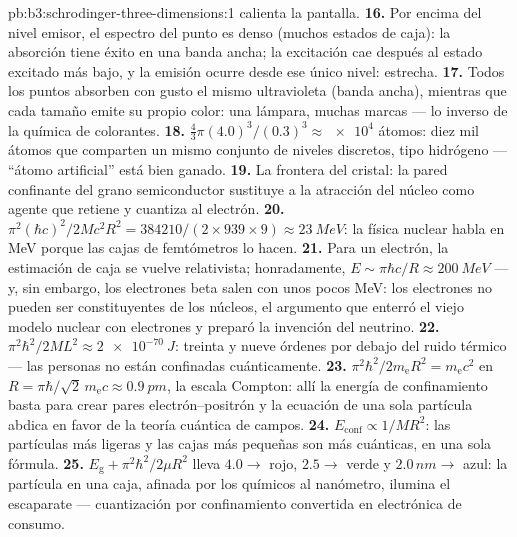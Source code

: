 \begin{solution}{pb:b3:schrodinger-three-dimensions:1}
calienta la pantalla.
\textbf{16.} Por encima del nivel emisor, el espectro del punto es denso
(muchos estados de caja): la absorción tiene éxito en una banda ancha; la
excitación cae después al estado excitado más bajo, y la emisión ocurre
desde ese único nivel: estrecha.
\textbf{17.} Todos los puntos absorben con gusto el mismo ultravioleta
(banda ancha), mientras que cada tamaño emite su propio color: una lámpara,
muchas marcas --- lo inverso de la química de colorantes.
\textbf{18.} $\tfrac43\pi(4.0)^3/(0.3)^3 \approx \num{e4}$ átomos:
diez mil átomos que comparten un mismo conjunto de niveles discretos, tipo
hidrógeno --- ``átomo artificial'' está bien ganado.
\textbf{19.} La frontera del cristal: la pared confinante del grano
semiconductor sustituye a la atracción del núcleo como agente que retiene y
cuantiza al electrón.
\textbf{20.} $\pi^2(\hbar c)^2/2Mc^2R^2 = 384210/(2 \times 939
\times 9) \approx \qty{23}{MeV}$: la física nuclear habla en MeV porque las
cajas de femtómetros lo hacen.
\textbf{21.} Para un electrón, la estimación de caja se vuelve relativista;
honradamente, $E \sim \pi\hbar c/R \approx \qty{200}{MeV}$ --- y, sin
embargo, los electrones beta salen con unos pocos MeV: los electrones no
pueden ser constituyentes de los núcleos, el argumento que enterró el viejo
modelo nuclear con electrones y preparó la invención del neutrino.
\textbf{22.} $\pi^2\hbar^2/2ML^2 \approx \qty{2e-70}{J}$:
treinta y nueve órdenes por debajo del ruido térmico --- las personas no
están confinadas cuánticamente.
\textbf{23.} $\pi^2\hbar^2/2m_{\text{e}}R^2 = m_{\text{e}}c^2$ en
$R = \pi\hbar/\sqrt2\,m_{\text{e}}c \approx \qty{0.9}{pm}$, la
escala Compton: allí la energía de confinamiento basta para crear pares
electrón--positrón y la ecuación de una sola partícula abdica en favor de la
teoría cuántica de campos.
\textbf{24.} $E_{\text{conf}} \propto 1/MR^2$: las partículas más ligeras y
las cajas más pequeñas son más cuánticas, en una sola fórmula.
\textbf{25.} $E_{\text{g}} + \pi^2\hbar^2/2\mu R^2$ lleva $4.0 \to$
rojo, $2.5 \to$ verde y $2.0\,\unit{nm} \to$ azul: la partícula en una
caja, afinada por los químicos al nanómetro, ilumina el escaparate ---
cuantización por confinamiento convertida en electrónica de consumo.
\end{solution}
